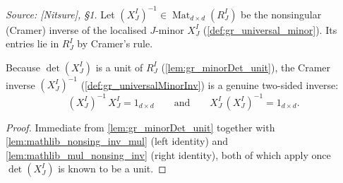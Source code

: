 \begin{definition}\leanok
  \label{def:gr_universalMinorInv}
  \textit{Source: [Nitsure], \S 1.}
  Let \((X^I_J)^{-1} \in \operatorname{Mat}_{d \times d}(R^I_J)\) be the
  nonsingular (Cramer) inverse of the localised \(J\)-minor \(X^I_J\)
  (\cref{def:gr_universal_minor}). Its entries lie in \(R^I_J\) by Cramer's rule.
\end{definition}

\begin{lemma}\leanok
  \label{lem:gr_universalMinorInv_identities}
  Because \(\det(X^I_J)\) is a unit of \(R^I_J\) (\cref{lem:gr_minorDet_unit}),
  the Cramer inverse \((X^I_J)^{-1}\) (\cref{def:gr_universalMinorInv}) is a
  genuine two-sided inverse:
  \[
    (X^I_J)^{-1}\, X^I_J = 1_{d\times d}
    \qquad\text{and}\qquad
    X^I_J\, (X^I_J)^{-1} = 1_{d\times d}.
  \]
\end{lemma}
\begin{proof}
  \leanok
  Immediate from \cref{lem:gr_minorDet_unit} together with
  \cref{lem:mathlib_nonsing_inv_mul} (left identity) and
  \cref{lem:mathlib_mul_nonsing_inv} (right identity), both of which apply once
  \(\det(X^I_J)\) is known to be a unit.
\end{proof}

